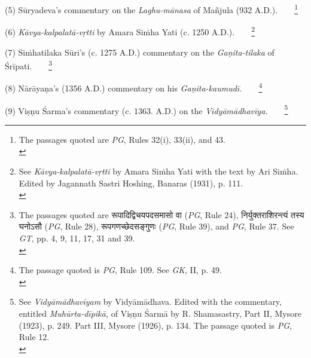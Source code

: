 \documentclass[10pt, openany]{book}
\begin{document}
{(5) Sūryadeva's commentary on the \textit{Laghu-mānasa} of Mañjula (932 A.D.).~~~~\renewcommand{\thefootnote}{\hspace{-4.3mm} 2}\footnote{\hspace{-2mm} \englishfont The passages quoted are \textit{PG}, Rules 32(i), 33(ii), and 43.\\}}
\vspace{2mm}

(6) \textit{Kāvya-kalpalatā-vṛtti }by Amara Siṁha Yati (c. 1250 A.D.).~~~~\renewcommand{\thefootnote}{\hspace{-4mm} 3}\footnote{\hspace{-2mm} \englishfont See\textit{ Kāvya-kalpalatā-vṛtti} by Amara Siṁha Yati with the
text by Ari Siṁha. Edited by Jagannath Sastri Hoshing, Banaras (1931), p. 111.\\}
\vspace{2mm}

{(7) Siṁhatilaka Sūri's (c. 1275 A.D.) commentary on the \textit{Gaṇita-tilaka} of Śrīpati.}~~~~\renewcommand{\thefootnote}{\hspace{-4.5mm} 4}\footnote{\hspace{-2mm} \englishfont The passages quoted are {\qt रूपादिद्विचयपदसमासो वा} (\textit{PG}, Rule 24), {\qt निर्युक्तराशिरन्त्यं तस्य घनोऽसौ} (\textit{PG}, Rule 28), {\qt रूपगणच्छेदसङ्गुणः} (\textit{PG}, Rule 39), and \textit{PG}, Rule 37. See \textit{GT}, pp. 4, 9, 11, 17, 31 and 39.\\}
\vspace{-2mm}

 (8) Nārāyaṇa's (1356 A.D.) commentary on his \textit{Gaṇita-kaumudī.}~~~~\renewcommand{\thefootnote}{\hspace{-4.5mm} 5}\footnote{\hspace{-2mm} \englishfont The passage quoted is \textit{PG}, Rule 109. See \textit{GK}, II, p. 49.\\}
\vspace{2mm}

(9) Viṣṇu Śarma's commentary (c. 1363. A.D.) on the \textit{Vidyāmādhavīya.}~~~~\renewcommand{\thefootnote}{\hspace{-5mm} 6}\footnote{\hspace{-2mm} \englishfont See \textit{Vidyāmādhavīyam} by Vidyāmādhava. Edited with the commentary, entitled \textit{Muhūrta-dīpikā,} of Viṣṇu Śarmā by R. Shamasastry, Part II, Mysore (1923), p. 249. Part III, Mysore (1926), p. 134. The passage quoted is \textit{PG}, Rule 12.\\}
\vspace{2mm}
\end{document}
